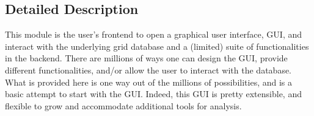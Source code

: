 \subsection{Detailed Description}
\begin{DoxyVerb}This module is the user's frontend to open a graphical user interface, GUI, and interact with the 
underlying grid database and a (limited) suite of functionalities in the backend. There are millions 
of ways one can design the GUI, provide different functionalities, and/or allow the user to interact 
with the database. What is provided here is one way out of the millions of possibilities, and is a 
basic attempt to start with the GUI. Indeed, this GUI is pretty extensible, and flexible to grow and
accommodate additional tools for analysis.
\end{DoxyVerb}
 